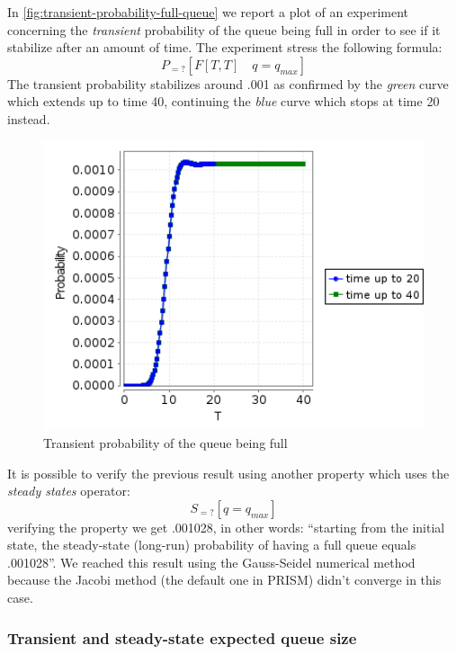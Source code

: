 In \autoref{fig:transient-probability-full-queue} we report a plot of
an experiment concerning the \emph{transient} probability of the queue
being full in order to see if it stabilize after an amount of
time. The experiment stress the following formula:
\begin{displaymath}
  P_{=?} [ F[T,T]\quad q=q_{max} ]
\end{displaymath}
The transient probability stabilizes around .001 as confirmed by the
\emph{green} curve which extends up to time 40, continuing the
\emph{blue} curve which stops at time 20 instead.
\begin{figure}[htb]
  \centering
  \includegraphics[width=13cm]{quantitative-project/transient-probability-full-queue.png}
  \caption{Transient probability of the queue being full}
  \label{fig:transient-probability-full-queue}
\end{figure}
It is possible to verify the previous result using another property
which uses the \emph{steady states} operator:
\begin{displaymath}
  S_{=?} [ q=q_{max} ]
\end{displaymath}
verifying the property we get .001028, in other words: ``starting from
the initial state, the steady-state (long-run) probability of having a
full queue equals .001028''. We reached this result using the
Gauss-Seidel numerical method because the Jacobi method (the default
one in PRISM) didn't converge in this case.

\subsubsection{Transient and steady-state expected queue size}

